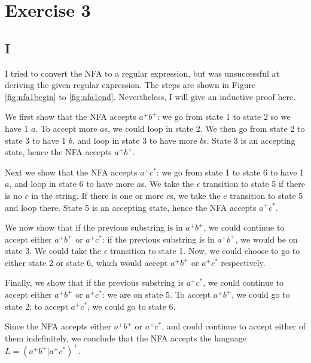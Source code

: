\documentclass{article}
\begin{document}
\section*{Exercise 3}
\subsection*{I}
I tried to convert the NFA to a regular expression, but was unsuccessful at
deriving the given regular expression. The steps are shown in Figure
\ref{fig:nfa1begin} to \ref{fig:nfa1end}. Nevertheless, I will give an
inductive proof here.

We first show that the NFA accepts $a^+b^+$: we go from state 1
to state 2 so we have 1 $a$. To accept more
$a$s, we could loop in state 2. We then go from state 2 to
state 3 to have 1 $b$, and loop in state 3 to have more
$b$s. State 3 is an accepting state, hence the NFA accepts
$a^+b^+$.

Next we show that the NFA accepts $a^+c^*$: we go from state 1 to
state 6 to have 1 $a$, and loop in state 6 to have more
$a$s. We take the $\epsilon$ transition to state
5 if there is no $c$ in the string. If there is one or more
$c$s, we take the $c$ transition to state
5 and loop there. State 5 is an accepting state, hence the NFA accepts
$a^+c^*$.

We now show that if the previous substring is in $a^+b^+$, we
could continue to accept either $a^+b^+$ or
$a^+c^*$: if the previous substring is in
$a^+b^+$, we would be on state 3. We could take the
$\epsilon$ transition to state 1. Now, we could choose to go to
either state 2 or state 6, which would accept $a^+b^+$ or
$a^+c^*$ respectively.

Finally, we show that if the previous substring is $a^+c^*$, we
could continue to accept either $a^+b^+$ or
$a^+c^*$: we are on state 5. To accept $a^+b^+$,
we could go to state 2; to accept $a^+c^*$, we could go to state
6.

Since the NFA accepts either $a^+b^+$ or
$a^+c^*$, and could continue to accept either of them
indefinitely, we conclude that the NFA accepts the language
$L=(a^+b^+|a^+c^*)^+$.
\end{document}
